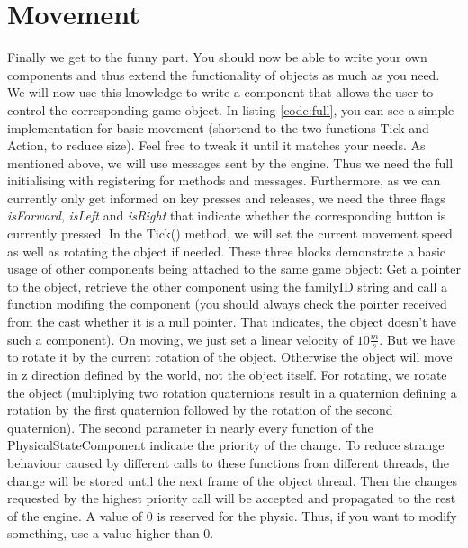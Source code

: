 \documentclass{article}
\begin{document}
\section{Movement}

Finally we get to the funny part. You should now be able to write your own components and thus extend the functionality of objects as much as you need. We will now use this knowledge to write a component that allows the user to control the corresponding game object. In listing \ref{code:full}, you can see a simple implementation for basic movement (shortend to the two functions Tick and Action, to reduce size). Feel free to tweak it until it matches your needs.\newline
As mentioned above, we will use messages sent by the engine. Thus we need the full initialising with registering for methods and messages. Furthermore, as we can currently only get informed on key presses and releases, we need the three flags \textit{isForward}, \textit{isLeft} and \textit{isRight} that indicate whether the corresponding button is currently pressed.\newline
In the Tick() method, we will set the current movement speed as well as rotating the object if needed. These three blocks demonstrate a basic usage of other components being attached to the same game object: Get a pointer to the object, retrieve the other component using the familyID string and call a function modifing the component (you should always check the pointer received from the cast whether it is a null pointer. That indicates, the object doesn't have such a component). On moving, we just set a linear velocity of $10\frac{m}{s}$. But we have to rotate it by the current rotation of the object. Otherwise the object will move in z direction defined by the world, not the object itself. For rotating, we rotate the object (multiplying two rotation quaternions result in a quaternion defining a rotation by the first quaternion followed by the rotation of the second quaternion). The second parameter in nearly every function of the PhysicalStateComponent indicate the priority of the change. To reduce strange behaviour caused by different calls to these functions from different threads, the change will be stored until the next frame of the object thread. Then the changes requested by the highest priority call will be accepted and propagated to the rest of the engine. A value of 0 is reserved for the physic. Thus, if you want to modify something, use a value higher than 0.\newline
\end{document}
